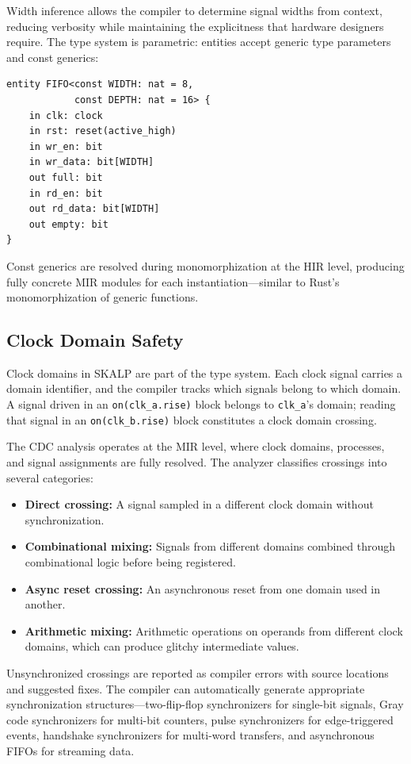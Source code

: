 \documentclass[conference]{IEEEtran}
\begin{document}
Width inference allows the compiler to determine signal widths from context, reducing verbosity while maintaining the explicitness that hardware designers require. The type system is parametric: entities accept generic type parameters and const generics:

\begin{lstlisting}
entity FIFO<const WIDTH: nat = 8,
            const DEPTH: nat = 16> {
    in clk: clock
    in rst: reset(active_high)
    in wr_en: bit
    in wr_data: bit[WIDTH]
    out full: bit
    in rd_en: bit
    out rd_data: bit[WIDTH]
    out empty: bit
}
\end{lstlisting}

Const generics are resolved during monomorphization at the HIR level, producing fully concrete MIR modules for each instantiation---similar to Rust's monomorphization of generic functions.

\subsection{Clock Domain Safety}

Clock domains in SKALP are part of the type system. Each clock signal carries a domain identifier, and the compiler tracks which signals belong to which domain. A signal driven in an \texttt{on(clk\_a.rise)} block belongs to \texttt{clk\_a}'s domain; reading that signal in an \texttt{on(clk\_b.rise)} block constitutes a clock domain crossing.

The CDC analysis operates at the MIR level, where clock domains, processes, and signal assignments are fully resolved. The analyzer classifies crossings into several categories:

\begin{itemize}
  \item \textbf{Direct crossing:} A signal sampled in a different clock domain without synchronization.
  \item \textbf{Combinational mixing:} Signals from different domains combined through combinational logic before being registered.
  \item \textbf{Async reset crossing:} An asynchronous reset from one domain used in another.
  \item \textbf{Arithmetic mixing:} Arithmetic operations on operands from different clock domains, which can produce glitchy intermediate values.
\end{itemize}

Unsynchronized crossings are reported as compiler errors with source locations and suggested fixes. The compiler can automatically generate appropriate synchronization structures---two-flip-flop synchronizers for single-bit signals, Gray code synchronizers for multi-bit counters, pulse synchronizers for edge-triggered events, handshake synchronizers for multi-word transfers, and asynchronous FIFOs for streaming data.
\end{document}
